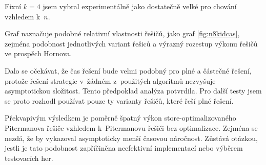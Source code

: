 Fixní $k = 4$ jsem vybral experimentálně jako dostatečně velké pro  chování vzhledem k~$n$.

Graf naznačuje podobné relativní vlastnosti řešičů, jako graf \ref{fig:n8kidcas}, zejména podobnost jednotlivých variant řešiců a výrazný rozestup výkonu řešičů ve prospěch Hornova.

Dalo se očekávat, že čas řešení bude velmi podobný pro plné a částečné řešení, protože řešení strategie v~žádném z~použitých algoritmů nezvyšuje asymptotickou složitost. Tento předpoklad analýza potvrdila. Pro další testy jsem se proto rozhodl používat pouze ty varianty řešičů, které řeší plné řešení.

Překvapivým výsledkem je poměrně špatný výkon store-op\-ti\-ma\-li\-zo\-va\-né\-ho Pitermanova řešiče vzhledem k~Pitermanovu řešiči bez optimalizace. Zejména se nezdá, že by vykazoval asymptoticky menší časovou náročnost. Zůstává otázkou, jestli je tato podobnost zapříčiněna neefektivní implementací nebo výběrem testovacích her.